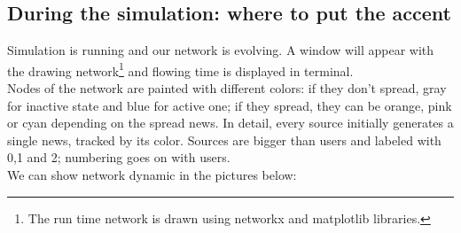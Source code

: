 \subsection{During the simulation: where to put the accent}
Simulation is running and our network is evolving. A window will appear with the drawing network\footnote{The run time network is drawn using networkx and matplotlib libraries.} and flowing time is displayed in terminal. \\
Nodes of the network are painted with different colors: if they don't spread, gray for inactive state and blue for active one; if they spread, they can be orange, pink or cyan depending on the spread news. In detail, every source initially generates a single news, tracked by its color. Sources are bigger than users and labeled with 0,1 and 2; numbering goes on with users.\\
We can show network dynamic in the pictures below:
